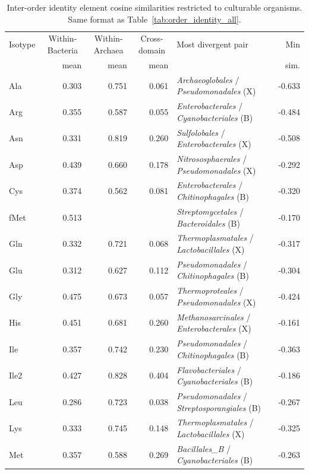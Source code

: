 \begin{table}[!ht]
\centering
\small
\caption{Inter-order identity element cosine similarities restricted to culturable organisms. Same format as Table~\ref{tab:order_identity_all}.}
\label{tab:order_identity_all_culturable}
\begin{tabular}{lrrrlr}
\toprule
Isotype & \multicolumn{1}{c}{Within-Bacteria} & \multicolumn{1}{c}{Within-Archaea} & \multicolumn{1}{c}{Cross-domain} & Most divergent pair & Min \\
 & mean & mean & mean & & sim. \\
\midrule
  Ala & 0.303 & 0.751 & 0.061 & \textit{Archaeoglobales} / \textit{Pseudomonadales} (X) & -0.633 \\
  Arg & 0.355 & 0.587 & 0.055 & \textit{Enterobacterales} / \textit{Cyanobacteriales} (B) & -0.484 \\
  Asn & 0.331 & 0.819 & 0.260 & \textit{Sulfolobales} / \textit{Enterobacterales} (X) & -0.508 \\
  Asp & 0.439 & 0.660 & 0.178 & \textit{Nitrososphaerales} / \textit{Pseudomonadales} (X) & -0.292 \\
  Cys & 0.374 & 0.562 & 0.081 & \textit{Enterobacterales} / \textit{Chitinophagales} (B) & -0.320 \\
  fMet & 0.513 & \text{---} & \text{---} & \textit{Streptomycetales} / \textit{Bacteroidales} (B) & -0.170 \\
  Gln & 0.332 & 0.721 & 0.068 & \textit{Thermoplasmatales} / \textit{Lactobacillales} (X) & -0.317 \\
  Glu & 0.312 & 0.627 & 0.112 & \textit{Pseudomonadales} / \textit{Chitinophagales} (B) & -0.304 \\
  Gly & 0.475 & 0.673 & 0.057 & \textit{Thermoproteales} / \textit{Pseudomonadales} (X) & -0.424 \\
  His & 0.451 & 0.681 & 0.260 & \textit{Methanosarcinales} / \textit{Enterobacterales} (X) & -0.161 \\
  Ile & 0.357 & 0.742 & 0.230 & \textit{Pseudomonadales} / \textit{Chitinophagales} (B) & -0.363 \\
  Ile2 & 0.427 & 0.828 & 0.404 & \textit{Flavobacteriales} / \textit{Cyanobacteriales} (B) & -0.186 \\
  Leu & 0.286 & 0.723 & 0.038 & \textit{Pseudomonadales} / \textit{Streptosporangiales} (B) & -0.267 \\
  Lys & 0.333 & 0.745 & 0.148 & \textit{Thermoplasmatales} / \textit{Lactobacillales} (X) & -0.325 \\
  Met & 0.357 & 0.588 & 0.269 & \textit{Bacillales\_B} / \textit{Cyanobacteriales} (B) & -0.263 \\

\end{tabular}
\end{table}
